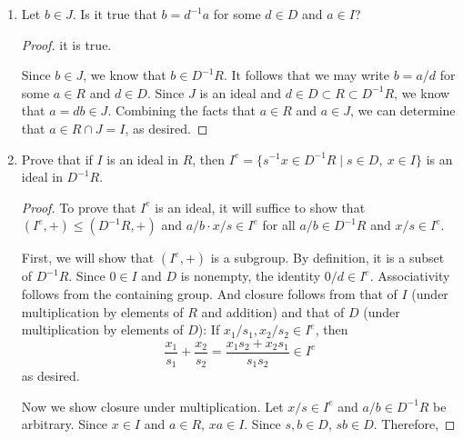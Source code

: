 \documentclass[../psets.tex]{subfiles}
\begin{document}
\begin{enumerate}
\begin{enumerate}[label={(\alph*)}]
\begin{proof}
            Suppose for the sake of contradiction that there exists $x\in I\cap D$. Then $x\in I$ and $x\in D$. It follows from the latter statement that $1/x\in D^{-1}R$. It follows from the former statement that $x\in R$ and $x\in J$. Since $J$ is an ideal of $D^{-1}R$ (hence is closed under multiplication by elements of $D^{-1}R$) and $x\in J$, we have in particular that
            \begin{equation*}
                \frac{1}{x}\cdot x = \frac{x}{x} = 1 \in J
            \end{equation*}
            It follows that $J=D^{-1}R$. Consequently, since $R\subset D^{-1}R$, we have that $I=R\cap D^{-1}R=R$. This contradicts the hypothesis that $I\neq R$.
        \end{proof}
        \item Let $b\in J$. Is it true that $b=d^{-1}a$ for some $d\in D$ and $a\in I$?
        \begin{proof}
             it is true.\par
            Since $b\in J$, we know that $b\in D^{-1}R$. It follows that we may write $b=a/d$ for some $a\in R$ and $d\in D$. Since $J$ is an ideal and $d\in D\subset R\subset D^{-1}R$, we know that $a=db\in J$. Combining the facts that $a\in R$ and $a\in J$, we can determine that $a\in R\cap J=I$, as desired.
        \end{proof}
        \item Prove that if $I$ is an ideal in $R$, then $I^e=\{s^{-1}x\in D^{-1}R\mid s\in D,\ x\in I\}$ is an ideal in $D^{-1}R$.
        \begin{proof}
            To prove that $I^e$ is an ideal, it will suffice to show that $(I^e,+)\leq(D^{-1}R,+)$ and $a/b\cdot x/s\in I^e$ for all $a/b\in D^{-1}R$ and $x/s\in I^e$.\par
            First, we will show that $(I^e,+)$ is a subgroup. By definition, it is a subset of $D^{-1}R$. Since $0\in I$ and $D$ is nonempty, the identity $0/d\in I^e$. Associativity follows from the containing group. And closure follows from that of $I$ (under multiplication by elements of $R$ and addition) and that of $D$ (under multiplication by elements of $D$): If $x_1/s_1,x_2/s_2\in I^e$, then
            \begin{equation*}
                \frac{x_1}{s_1}+\frac{x_2}{s_2} = \frac{x_1s_2+x_2s_1}{s_1s_2} \in I^e
            \end{equation*}
            as desired.\par
            Now we show closure under multiplication. Let $x/s\in I^e$ and $a/b\in D^{-1}R$ be arbitrary. Since $x\in I$ and $a\in R$, $xa\in I$. Since $s,b\in D$, $sb\in D$. Therefore,

\end{proof}
\end{enumerate}
\end{enumerate}
\end{document}
